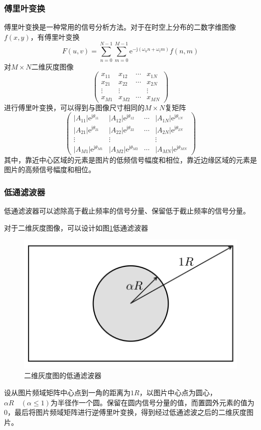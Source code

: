 \subsubsection{傅里叶变换}
傅里叶变换是一种常用的信号分析方法。对于在时空上分布的二数字维图像$f(x, y)$，有傅里叶变换
\[ F(u, v) = \sum_{n = 0}^{N - 1}\sum_{m = 0}^{M - 1}\mathrm{e}^{-\mathrm{j}(\omega_kn+\omega_lm)}f(n, m) \]
对$M\times N$二维灰度图像
\[\begin{pmatrix}
x_{11} & x_{12} & \cdots & x_{1N} \\
x_{21} & x_{22} & \cdots & x_{2N} \\
\vdots & \vdots && \vdots \\
x_{M1} & x_{M2} & \cdots & x_{MN}
\end{pmatrix} \]
进行傅里叶变换，可以得到与图像尺寸相同的$M\times N$复矩阵
\[ \begin{pmatrix}
|A_{11}|\mathrm{e}^{\mathrm{j}\theta_{11}} & |A_{12}|\mathrm{e}^{\mathrm{j}\theta_{12}} & \cdots & |A_{1N}|\mathrm{e}^{\mathrm{j}\theta_{1N}} \\
|A_{21}|\mathrm{e}^{\mathrm{j}\theta_{21}} & |A_{22}|\mathrm{e}^{\mathrm{j}\theta_{22}} & \cdots & |A_{2N}|\mathrm{e}^{\mathrm{j}\theta_{2N}} \\
\vdots & \vdots && \vdots \\
|A_{M1}|\mathrm{e}^{\mathrm{j}\theta_{M1}} & |A_{M2}|\mathrm{e}^{\mathrm{j}\theta_{M2}} & \cdots & |A_{MN}|\mathrm{e}^{\mathrm{j}\theta_{MN}}
\end{pmatrix} \]
其中，靠近中心区域的元素是图片的低频信号幅度和相位，靠近边缘区域的元素是图片的高频信号幅度和相位。
\subsubsection{低通滤波器}
低通滤波器可以滤除高于截止频率的信号分量、保留低于截止频率的信号分量。

对于二维灰度图像，可以设计如图\ref{fig:imagelowpassfilter}低通滤波器
\begin{figure}[H]
	\centering
	\includegraphics[width=0.7\linewidth]{figure/image_low_pass_filter}
	\caption{二维灰度图的低通滤波器}
	\label{fig:imagelowpassfilter}
\end{figure}
设从图片频域矩阵中心点到一角的距离为$1R$，以图片中心点为圆心，$\alpha R\quad (\alpha \leq1)$为半径作一个圆。保留在圆内信号分量的值，而置圆外元素的值为$0$，最后将图片频域矩阵进行逆傅里叶变换，得到经过低通滤波之后的二维灰度图片。
